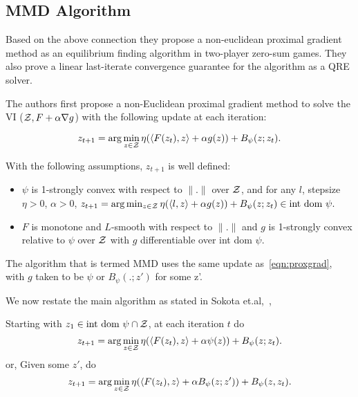 


\subsection{MMD Algorithm}

Based on the above connection they propose a non-euclidean proximal gradient method as an
equilibrium finding algorithm in two-player zero-sum games.
They also prove a linear last-iterate convergence guarantee for the algorithm as a QRE solver.

The authors first propose a non-Euclidean proximal gradient method to solve the VI ($\mathcal{Z}, F +
	\alpha \nabla g$) with the following update at each iteration:

\begin{equation}
	\label{eqn:proxgrad} z_{t+1} = \arg \min_{z \in \mathcal{Z}} \eta (\langle F(z_t), z\rangle + \alpha
	g(z)) + B_{\psi} (z; z_t).
\end{equation}

With the following assumptions, $z_{t+1}$ is well defined:

\begin{itemize}
	\item $\psi$ is 1-strongly convex with respect to $\|.
		      \|$ over $\mathcal{Z}$, and for
	      any $l$, stepsize $\eta > 0$, $\alpha > 0$,
	      $z_{t+1} = \arg \min_{z \in \mathcal{Z}} \eta (\langle l, z \rangle + \alpha g(z)) + B_{\psi}(z;z_t) \in \text{int dom } \psi.$

	\item $F$ is monotone and $L$-smooth with respect to $\|.\|$ and $g$ is 1-strongly convex
	      relative to $\psi$ over $\mathcal{Z}$ with $g$ differentiable over int dom $\psi$.
\end{itemize}

The algorithm that is termed MMD uses the same update as~\ref{eqn:proxgrad}, with $g$ taken to be
$\psi$ or $B_{\psi}(.
	;z')$ for some z'.

We now restate the main algorithm as stated in Sokota et.al,~\cite{sokotaUnified2023},

\begin{alprocedure}[H]  \label{alg:mmd} Starting with $z_1 \in \text{int dom } \psi \cap \mathcal{Z}$,
	at each iteration $t$ do $$ z_{t+1} = \arg \min_{z \in \mathcal{Z}} \eta (\langle F(z_t), z\rangle +
		\alpha \psi(z)) + B_{\psi} (z; z_t).
	$$
	or,
	Given some $z'$, do $$ z_{t+1} = \arg \min_{z \in \mathcal{Z}} \eta (\langle F(z_t), z\rangle + \alpha
		B_{\psi}(z; z')) + B_{\psi} (z, z_t).
	$$
\end{alprocedure}

